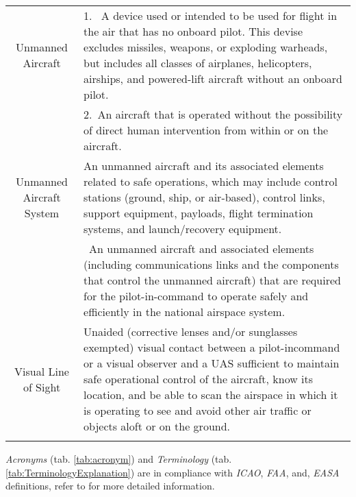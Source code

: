 \begin{tabularx}{\textwidth}{S{0.22}|X}
     Unmanned Aircraft & 1.~ A device used or intended to be used for flight in the air that has no onboard pilot. This devise excludes missiles, weapons, or exploding warheads, but includes all classes of airplanes, helicopters, airships, and powered-lift aircraft without an onboard pilot.\\
     &2.~An aircraft that is operated without the possibility of direct human intervention from within or on the aircraft.\\\hline
     Unmanned Aircraft System & An unmanned aircraft and its associated elements related to safe operations, which may include control stations (ground, ship, or air-based), control links, support equipment, payloads, flight termination systems, and launch/recovery equipment.\\
     &~An unmanned aircraft and associated elements (including communications links and the components that control the unmanned aircraft) that are required for the pilot-in-command to operate safely and efficiently in the national airspace system. \\\hline
     Visual Line of Sight & Unaided (corrective lenses and/or sunglasses exempted) visual contact between a pilot-incommand or a visual observer and a UAS sufficient to maintain safe operational control of the aircraft, know its location, and be able to scan the airspace in which it is operating to see and avoid other air traffic or objects aloft or on the ground.\\
     \caption{Terminology}
     \label{tab:TerminologyExplanation}
\end{tabularx}

\begin{note}
\emph{Acronyms} (tab. \ref{tab:acronym}) and \emph{Terminology} (tab. \ref{tab:TerminologyExplanation}) are in compliance with \emph{ICAO}, \emph{FAA}, and, \emph{EASA} definitions, refer to  \cite{huerta2013integration} for more detailed information.
\end{note}